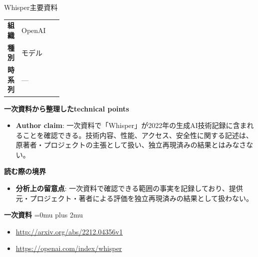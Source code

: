 \begin{technicalnote}{Whisper}{主要資料}
\begingroup
\begin{tabularx}{\linewidth}{@{}>{\bfseries}p{0.22\linewidth}X@{}}
組織 & OpenAI \\
種別 & モデル \\
時系列 & — \\
\end{tabularx}
\smallskip
{\bfseries 一次資料から整理したtechnical points}
\begin{itemize}[leftmargin=1.5em,itemsep=0.35em]
\item \textbf{Author claim}: 一次資料で「Whisper」が2022年の生成AI技術記録に含まれることを確認できる。技術内容、性能、アクセス、安全性に関する記述は、原著者・プロジェクトの主張として扱い、独立再現済みの結果とはみなさない。
\end{itemize}
\begin{minipage}{\linewidth}
{\bfseries 読む際の境界}
\begin{itemize}[leftmargin=1.5em,itemsep=0.35em]
\item \textbf{分析上の留意点}: 一次資料で確認できる範囲の事実を記録しており、提供元・プロジェクト・著者による評価を独立再現済みの結果として扱わない。
\end{itemize}
\begin{samepage}
{\bfseries 一次資料}
\begingroup\sloppy
\Urlmuskip=0mu plus 2mu\relax
\begin{itemize}[leftmargin=1.5em,itemsep=0.25em]
\item {\scriptsize\url{http://arxiv.org/abs/2212.04356v1}}
\item {\scriptsize\url{https://openai.com/index/whisper}}
\end{itemize}
\endgroup
\end{samepage}
\end{minipage}
\endgroup
\end{technicalnote}
\medskip

